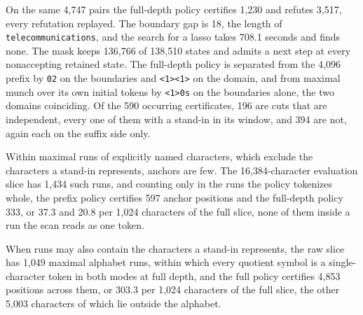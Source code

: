 \documentclass[11pt,a4paper]{article}
\theoremstyle{definition}
\theoremstyle{plain}
\newcommand{\code}[1]{\texttt{#1}}
\begin{document}
On the same 4{,}747 pairs the full-depth policy certifies 1{,}230 and refutes 3{,}517, every refutation replayed. The
boundary gap is 18, the length of \code{telecommunications}, and the search for a lasso takes 708.1 seconds and finds
none. The mask keeps 136{,}766 of 138{,}510 states and admits a next step at every nonaccepting retained state. The
full-depth policy is separated from the 4{,}096 prefix by \code{02} on the boundaries and \code{<1><1>} on the domain,
and from maximal munch over its own initial tokens by \code{<1>0s} on the boundaries alone, the two domains coinciding.
Of the 590 occurring certificates, 196 are cuts that are independent, every one of them with a stand-in in its window,
and 394 are not, again each on the suffix side only.

Within maximal runs of explicitly named characters, which exclude the characters a stand-in represents, anchors are few.
The 16{,}384-character evaluation slice has 1{,}434 such runs, and counting only in the runs the policy tokenizes whole,
the prefix policy certifies 597 anchor positions and the full-depth policy 333, or 37.3 and 20.8 per 1{,}024 characters
of the full slice, none of them inside a run the scan reads as one token.

When runs may also contain the characters a stand-in represents, the raw slice has 1{,}049 maximal alphabet runs, within
which every quotient symbol is a single-character token in both modes at full depth, and the full policy certifies
4{,}853 positions across them, or 303.3 per 1{,}024 characters of the full slice, the other 5{,}003 characters of which
lie outside the alphabet.

\end{document}
